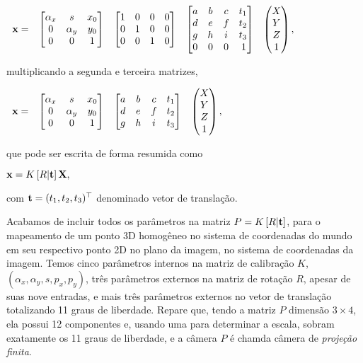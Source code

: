 \begin{center}
$
\begin{array}{ccccc}
\mathbf{x}=
&
\begin{bmatrix}
\alpha_x&s&x_0\\
0&\alpha_y&y_0\\
0&0&1
\end{bmatrix}&
\begin{bmatrix}
1&0&0&0\\
0&1&0&0\\
0&0&1&0
\end{bmatrix}
&
\begin{bmatrix}
a&b&c&t_1\\
d&e&f&t_2\\
g&h&i&t_3\\
0&0&0&\,1
\end{bmatrix}
&
\begin{pmatrix}
X\\
Y\\
Z\\
1
\end{pmatrix},
\end{array}
$
\end{center}
multiplicando a segunda e terceira matrizes,
 
\begin{center}
$
\begin{array}{cccc}
\mathbf{x}=
&
\begin{bmatrix}
\alpha_x&s&x_0\\
0&\alpha_y&y_0\\
0&0&1
\end{bmatrix}&
\begin{bmatrix}
a&b&c&t_1\\
d&e&f&t_2\\
g&h&i&t_3
\end{bmatrix}
&
\begin{pmatrix}
X\\
Y\\
Z\\
1
\end{pmatrix},
\end{array}
$
\end{center}
que pode ser escrita de forma resumida como

\begin{center}
$
\mathbf{x}=K\,[R|{\bf t}]\,\mathbf{X},
$
\end{center}
com ${\bf t}=(t_1,t_2,t_3)^\top$ denominado vetor de translação.

Acabamos de incluir todos os parâmetros na matriz $P=K\,[R|{\bf t}]$, para o mapeamento de um ponto 3D homogêneo no sistema de coordenadas do mundo em seu respectivo ponto 2D no plano da imagem, no sistema de coordenadas da imagem. Temos cinco parâmetros internos na matriz de calibração $K$, $(\alpha_x,\alpha_y,s,p_x,p_y)$, três parâmetros externos na matriz de rotação $R$, apesar de suas nove entradas, e mais três parâmetros externos no vetor de translação totalizando 11 graus de liberdade. Repare que, tendo a matriz $P$ dimensão $3\times4$, ela possui 12 componentes e, usando uma para determinar a escala, sobram exatamente os 11 graus de liberdade, e a câmera $P$ é chamda câmera de \textit{projeção finita}.

